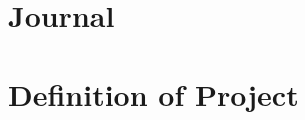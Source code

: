 
\chapter{Journal}


\chapter{Definition of Project}
\begin{figure}[H]
\centering
\setlength\fboxsep{0pt}
\setlength\fboxrule{0.5pt}
\end{figure}

